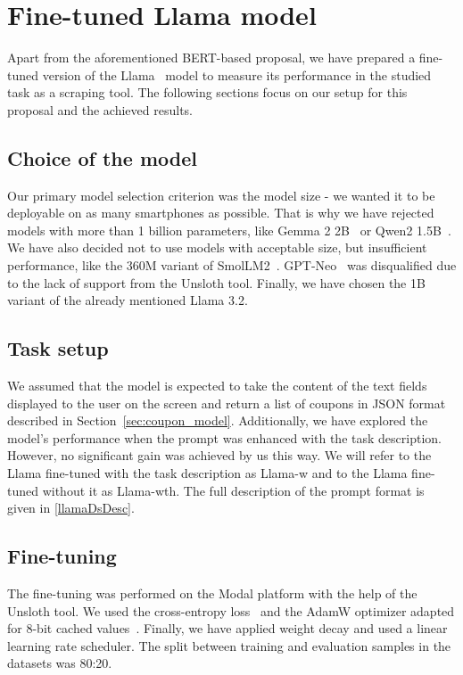 \documentclass[licencjacka,en]{pracamgr}
\begin{document}
\FloatBarrier

\chapter{Fine-tuned Llama model} \label{chap:llama}

Apart from the aforementioned BERT-based proposal, we have prepared a fine-tuned version of the Llama~\cite{meta-llama} model to measure its performance in the studied task as a scraping tool. The following sections focus on our setup for this proposal and the achieved results.

\section{Choice of the model}

Our primary model selection criterion was the model size - we wanted it to be deployable on as many smartphones as possible. That is why we have rejected models with more than 1 billion parameters, like Gemma 2 2B~\cite{gemma2} or Qwen2 1.5B~\cite{yang2024qwen2technicalreport}. We have also decided not to use models with acceptable size, but insufficient performance, like the 360M variant of SmolLM2~\cite{smollm2}. GPT-Neo~\cite{gpt-neo} was disqualified due to the lack of support from the Unsloth tool. Finally, we have chosen the 1B variant of the already mentioned Llama 3.2.

\section{Task setup}

We assumed that the model is expected to take the content of the text fields displayed to the user on the screen and return a list of coupons in JSON format described in Section~\ref{sec:coupon_model}. Additionally, we have explored the model's performance when the prompt was enhanced with the task description. However, no significant gain was achieved by us this way. We will refer to the Llama fine-tuned with the task description as Llama-w and to the Llama fine-tuned without it as Llama-wth. The full description of the prompt format is given in \ref{llamaDsDesc}.

\section{Fine-tuning}
The fine-tuning was performed on the Modal platform with the help of the Unsloth tool. We used the cross-entropy loss~\cite{mao2023crossentropylossfunctionstheoretical} and the AdamW optimizer adapted for 8-bit cached values~\cite{hf-bnb}. Finally, we have applied weight decay and used a linear learning rate scheduler. The split between training and evaluation samples in the datasets was 80:20.
\end{document}
